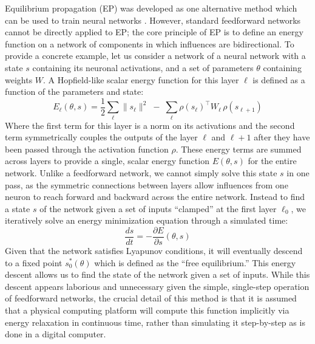\documentclass[11pt]{article}
\theoremstyle{definition}
\begin{document}
Equilibrium propagation (EP) was developed as one alternative method
which can be used to train neural networks \cite{scellierEquilibriumPropagationBridging2017}.
However, standard feedforward networks cannot be directly applied to
EP; the core principle of EP is to define an energy function on a
network of components in which influences are bidirectional. To
provide a concrete example, let us consider a network of a neural
network with a state $s$ containing its neuronal activations, and a
set of parameters $\theta$ containing weights $W$. A Hopfield-like
scalar energy function for this layer $\ell$ is defined as a function
of the parameters and state:
\begin{equation}
E_{\ell}(\theta, s) = \frac{1}{2}\sum_{\ell} \|s_\ell\|^2 \;-\;
\sum_{\ell} \rho(s_\ell)^\top W_\ell\, \rho(s_{\ell+1})
\end{equation}
Where the first term for this layer is a norm on its activations and
the second term symmetrically couples the outputs of the layer
$\ell$ and $\ell+1$ after they have been passed through the activation
function $\rho$. These energy terms are summed across layers to
provide a single, scalar energy function $E(\theta, s)$ for the
entire network. Unlike a feedforward network, we cannot simply solve
this state $s$ in one pass, as the symmetric connections between
layers allow influences from one neuron to reach forward and backward
across the entire network. Instead to find a state $s$ of the network
given a set of inputs ``clamped'' at the first layer $\ell_0$, we
iteratively solve an energy minimization equation through a simulated
time:
\begin{equation}
\frac{ds}{dt} = -\frac{\partial E}{\partial s}(\theta, s)
\end{equation}
Given that the network satisfies Lyapunov conditions, it will
eventually descend to a fixed point $s_0^*(\theta)$ which is defined
as the ``free equilibrium.'' This energy descent allows us to find
the state of the network given a set of inputs. While this descent
appears laborious and unnecessary given the simple, single-step
operation of feedforward networks, the crucial detail of this method
is that it is assumed that a physical computing platform will compute
this function implicitly via energy relaxation in continuous time,
rather than simulating it step-by-step as is done in a digital
computer.
\end{document}
